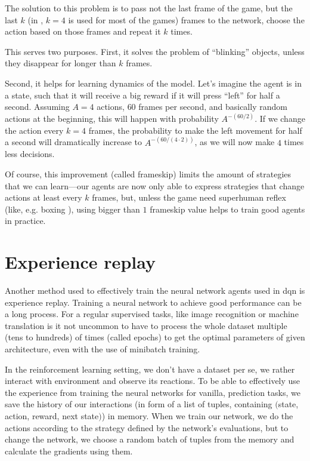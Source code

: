 The solution to this problem is to pass not the last frame of the game, but the last $k$ (in \cite{nips-dqn}, $k=4$ is used for most of the games) frames to the network, choose the action based on those frames and repeat it $k$ times.

This serves two purposes. First, it solves the problem of ``blinking'' objects, unless they disappear for longer than $k$ frames.

Second, it helps for learning dynamics of the model. Let's imagine the agent is in a state, such that it will receive a big reward if it will press ``left'' for half a second. Assuming $A=4$ actions, $60$ frames per second, and basically random actions at the beginning, this will happen with probability $A^{-(60 / 2)}$. If we change the action every $k=4$ frames, the probability to make the left movement for half a second will dramatically increase to $A^{-(60/(4 \cdot 2))}$, as we will now make $4$ times less decisions.

Of course, this improvement (called frameskip) limits the amount of strategies that we can learn---our agents are now only able to express strategies that change actions at least every $k$ frames, but, unless the game need superhuman reflex (like, e.g. boxing ), using bigger than $1$ frameskip value helps to train good agents in practice.

\section{Experience replay}\label{experience-replay}
Another method used to effectively train the neural network agents used in dqn is experience replay. Training a neural network to achieve good performance can be a long process. For a regular supervised tasks, like image recognition or machine translation is it not uncommon to have to process the whole dataset multiple (tens to hundreds) of times (called epochs) to get the optimal parameters of given architecture, even with the use of minibatch training.

In the reinforcement learning setting, we don't have a dataset per se, we rather interact with environment and observe its reactions. To be able to effectively use the experience from training the neural networks for vanilla, prediction tasks, we save the history of our interactions (in form of a list of tuples, containing $($state, action, reward, next state$)$) in memory. When we train our network, we do the actions according to the strategy defined by the network's evaluations, but to change the network, we choose a random batch of tuples from the memory and calculate the gradients using them.

